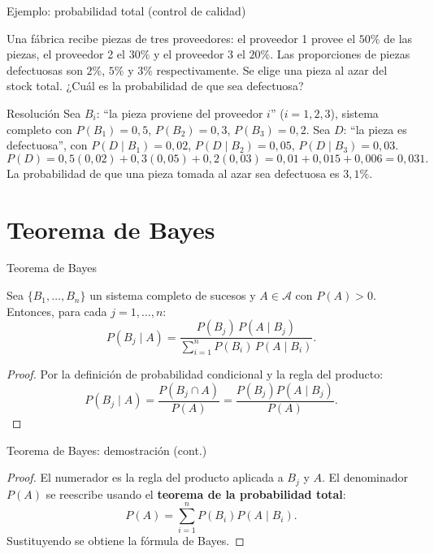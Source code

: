 \documentclass[aspectratio=169,11pt]{beamer}
\begin{document}
\begin{frame}{Ejemplo: probabilidad total (control de calidad)}
\begin{example}
Una fábrica recibe piezas de tres proveedores: el proveedor 1 provee el $50\%$ de las piezas, el proveedor 2 el $30\%$ y el proveedor 3 el $20\%$. Las proporciones de piezas defectuosas son $2\%$, $5\%$ y $3\%$ respectivamente. Se elige una pieza al azar del stock total. ¿Cuál es la probabilidad de que sea defectuosa?
\end{example}
\begin{block}{Resolución}
Sea $B_i$: ``la pieza proviene del proveedor $i$'' ($i=1,2,3$), sistema completo con $P(B_1)=0{,}5$, $P(B_2)=0{,}3$, $P(B_3)=0{,}2$. Sea $D$: ``la pieza es defectuosa'', con $P(D\mid B_1)=0{,}02$, $P(D\mid B_2)=0{,}05$, $P(D\mid B_3)=0{,}03$.
\[
P(D) = 0{,}5(0{,}02)+0{,}3(0{,}05)+0{,}2(0{,}03) = 0{,}01+0{,}015+0{,}006 = 0{,}031.
\]
La probabilidad de que una pieza tomada al azar sea defectuosa es $3{,}1\%$.
\end{block}
\end{frame}

\section{Teorema de Bayes}

\begin{frame}{Teorema de Bayes}
\begin{theorem}
Sea $\{B_1,\dots,B_n\}$ un sistema completo de sucesos y $A\in\mathcal{A}$ con $P(A)>0$. Entonces, para cada $j=1,\dots,n$:
\[
P(B_j \mid A) = \frac{P(B_j)\,P(A\mid B_j)}{\displaystyle\sum_{i=1}^{n} P(B_i)\,P(A\mid B_i)}.
\]
\end{theorem}
\begin{proof}
Por la definición de probabilidad condicional y la regla del producto:
\[
P(B_j\mid A) = \frac{P(B_j\cap A)}{P(A)} = \frac{P(B_j)P(A\mid B_j)}{P(A)}.
\]
\end{proof}
\end{frame}

\begin{frame}{Teorema de Bayes: demostración (cont.)}
\begin{proof}
El numerador es la regla del producto aplicada a $B_j$ y $A$. El denominador $P(A)$ se reescribe usando el \textbf{teorema de la probabilidad total}:
\[
P(A) = \sum_{i=1}^n P(B_i)P(A\mid B_i).
\]
Sustituyendo se obtiene la fórmula de Bayes. \qedhere
\end{proof}
\end{frame}
\end{document}

